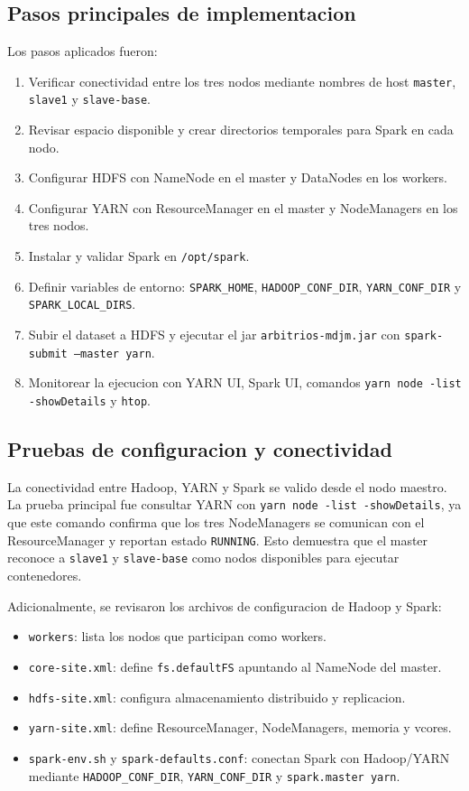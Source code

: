 \subsection{Pasos principales de implementacion}

Los pasos aplicados fueron:

\begin{enumerate}
    \item Verificar conectividad entre los tres nodos mediante nombres de host \texttt{master}, \texttt{slave1} y \texttt{slave-base}.
    \item Revisar espacio disponible y crear directorios temporales para Spark en cada nodo.
    \item Configurar HDFS con NameNode en el master y DataNodes en los workers.
    \item Configurar YARN con ResourceManager en el master y NodeManagers en los tres nodos.
    \item Instalar y validar Spark en \texttt{/opt/spark}.
    \item Definir variables de entorno: \texttt{SPARK\_HOME}, \texttt{HADOOP\_CONF\_DIR}, \texttt{YARN\_CONF\_DIR} y \texttt{SPARK\_LOCAL\_DIRS}.
    \item Subir el dataset a HDFS y ejecutar el jar \texttt{arbitrios-mdjm.jar} con \texttt{spark-submit --master yarn}.
    \item Monitorear la ejecucion con YARN UI, Spark UI, comandos \texttt{yarn node -list -showDetails} y \texttt{htop}.
\end{enumerate}

\subsection{Pruebas de configuracion y conectividad}

La conectividad entre Hadoop, YARN y Spark se valido desde el nodo maestro. La prueba principal fue consultar YARN con \texttt{yarn node -list -showDetails}, ya que este comando confirma que los tres NodeManagers se comunican con el ResourceManager y reportan estado \texttt{RUNNING}. Esto demuestra que el master reconoce a \texttt{slave1} y \texttt{slave-base} como nodos disponibles para ejecutar contenedores.

Adicionalmente, se revisaron los archivos de configuracion de Hadoop y Spark:

\begin{itemize}
    \item \texttt{workers}: lista los nodos que participan como workers.
    \item \texttt{core-site.xml}: define \texttt{fs.defaultFS} apuntando al NameNode del master.
    \item \texttt{hdfs-site.xml}: configura almacenamiento distribuido y replicacion.
    \item \texttt{yarn-site.xml}: define ResourceManager, NodeManagers, memoria y vcores.
    \item \texttt{spark-env.sh} y \texttt{spark-defaults.conf}: conectan Spark con Hadoop/YARN mediante \texttt{HADOOP\_CONF\_DIR}, \texttt{YARN\_CONF\_DIR} y \texttt{spark.master yarn}.
\end{itemize}

